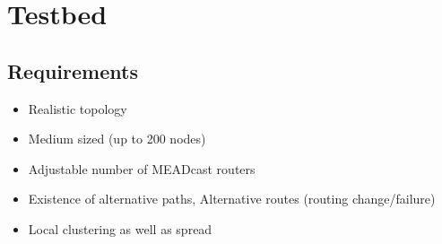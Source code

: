 
%

\section{Testbed} %
\label{sec:Testbed_Design}

\subsection{Requirements} %

\label{sub:Requirements}
\begin{itemize}
    \item Realistic topology
    \item Medium sized (up to 200 nodes)
    \item Adjustable number of MEADcast routers
    \item Existence of alternative paths, Alternative routes (routing change/failure)
    \item Local clustering as well as spread
\end{itemize}


